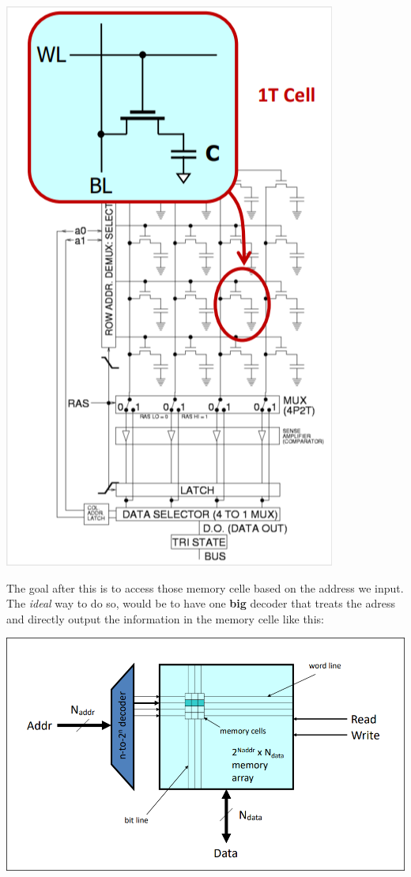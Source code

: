 \begin{center}
\includegraphics[scale=0.3]{screenshots/2025-10-12.png}
\end{center}
The goal after this is to access those memory celle based on the address we input. The \textit{ideal} way to do so, would be to have one \textbf{big} decoder that treats the adress and directly output the information in the memory celle like this:
\begin{center}
\includegraphics[scale=0.2]{screenshots/2025-10-12_1.png}
\end{center}
